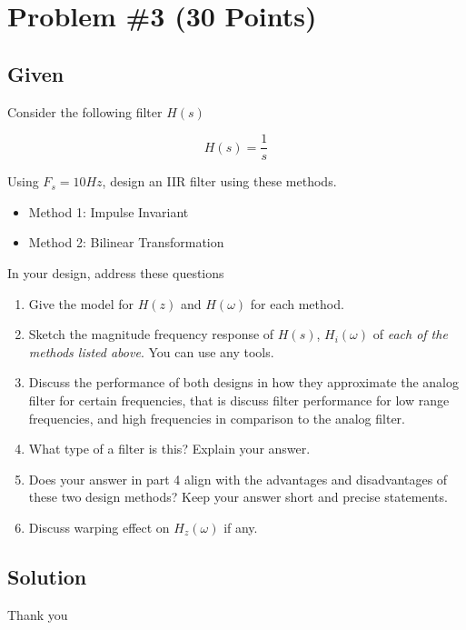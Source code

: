 \documentclass[12pt,letterpaper]{article}
\begin{document}
\newpage
\section*{Problem \#3 (30 Points)}
\hrulefill
\subsection*{Given}
Consider the following filter \( H(s) \)

\[
H(s) = \frac{1}{s}
\]

Using \( F_s = 10Hz \), design an IIR filter using these methods.
\begin{itemize}
    \item Method 1: Impulse Invariant
    \item Method 2: Bilinear Transformation
\end{itemize}

In your design, address these questions
\begin{enumerate}
    \item Give the model for \( H(z) \) and \( H(\omega) \) for each method.
    \item Sketch the magnitude frequency response of \( H(s) \), \( H_i(\omega) \) of \textit{each of the methods listed above}. You can use any tools.
    \item Discuss the performance of both designs in how they approximate the analog filter for certain frequencies, that is discuss filter performance for low range frequencies, and high frequencies in comparison to the analog filter.
    \item What type of a filter is this? Explain your answer.
    \item Does your answer in part 4 align with the advantages and disadvantages of these two design methods? Keep your answer short and precise statements.
    \item Discuss warping effect on \( H_z(\omega) \) if any.
\end{enumerate}
\newpage
\subsection*{Solution}







\newpage
Thank you
\end{document}

